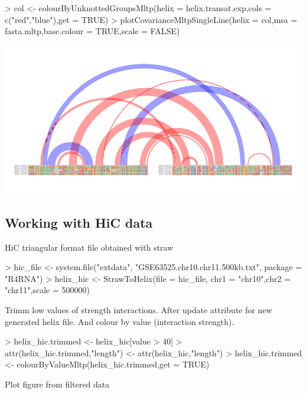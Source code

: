 \documentclass[letterpaper]{article}
\begin{document}
\begin{Schunk}
\begin{Sinput}
> col <- colourByUnknottedGroupsMltp(helix = helix.transat.exp,cols = c("red","blue"),get = TRUE)
> plotCovarianceMltpSingleLine(helix = col,msa = fasta.mltp,base.colour = TRUE,scale = FALSE)
\end{Sinput}
\end{Schunk}
\includegraphics{R4RNA-032}

\subsection{Working with HiC data}

HiC triangular format file obtained with straw

\begin{Schunk}
\begin{Sinput}
> hic_file <- system.file("extdata", "GSE63525.chr10.chr11.500kb.txt", package = "R4RNA")
> helix_hic <- StrawToHelix(file = hic_file, chr1 = "chr10",chr2 = "chr11",scale = 500000)
\end{Sinput}
\end{Schunk}


Trimm low values of strength interactions. After update attribute for new generated helix file. And colour by value (interaction strength).

\begin{Schunk}
\begin{Sinput}
> helix_hic.trimmed <- helix_hic[value > 40]
> attr(helix_hic.trimmed,"length") <- attr(helix_hic,"length")
> helix_hic.trimmed <- colourByValueMltp(helix_hic.trimmed,get = TRUE)
\end{Sinput}
\end{Schunk}

Plot figure from filtered data
\end{document}
